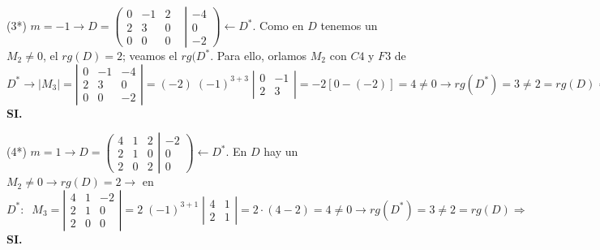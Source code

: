 \begin{proofw}
\noindent (3*)  $m=-1 \to  D=\left( \begin{matrix}  \boxed{0}&\boxed{-1}&2&\\\boxed{2}&\boxed{3}&0&\\0&0&0&    \end{matrix} \right|
\left. \begin{matrix}  -4\\0\\-2 \end{matrix} \right) \leftarrow D^*$. Como en $D$ tenemos un $M_2\neq 0$, el $rg(D)=2$; veamos el $rg(D^*$. Para ello, orlamos $M_2$ con $C4$ y $F3$ de $D^*\to |M_3|=\left| \begin{matrix} 0&-1&-4\\2&3&0\\0&0&-2 \end{matrix} \right| = (-2)\; (-1)^{3+3}\; \left| \begin{matrix} 0&-1\\2&3 \end{matrix} \right| = -2[0-(-2)]=4\neq 0 \to rg(D^*)=3\neq 2 = rg(D) \Rightarrow $ \textbf{ SI.}

\noindent (4*)  $m=1 \to  D=\left( \begin{matrix}  \boxed{4}& \boxed{1}&2\\ \boxed{2}& \boxed{1}&0\\2&0&2   \end{matrix} \right|
\left. \begin{matrix}  -2\\0\\0  \end{matrix} \right) \leftarrow D^*$. En $D$ hay un $\boxed{M_2}\neq 0 \to rg(D)=2 \to $ en $D^*: \;  \; M_3=\left| \begin{matrix} 4&1&-2\\2&1&0\\2&0&0 \end{matrix} \right| =2 \;(-1)^{3+1}\; \left| \begin{matrix} 4&1\\2&1 \end{matrix} \right|= 2\cdot (4-2)=4\neq 0 \to rg(D^*)=3\neq 2 = rg(D) \Rightarrow   $ \textbf{ SI.}

\end{proofw}




